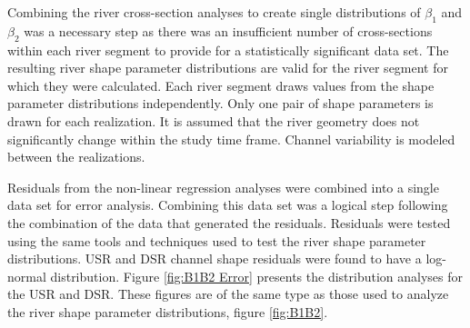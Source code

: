 \begin{linenumbers}
Combining the river cross-section analyses to create single distributions of $\beta_1$ and $\beta_2$ was a necessary step as there was an insufficient number of cross-sections within each river segment to provide for a statistically significant data set.  The resulting river shape parameter distributions are valid for the river segment for which they were calculated.  Each river segment draws values from the shape parameter distributions independently.  Only one pair of shape parameters is drawn for each realization.  It is assumed that the river geometry does not significantly change within the study time frame.  Channel variability is modeled between the realizations.

Residuals from the non-linear regression analyses were combined into a single data set for error analysis.  Combining this data set was a logical step following the combination of the data that generated the residuals.  Residuals were tested using the same tools and techniques used to test the river shape parameter distributions.  USR and DSR channel shape residuals were found to have a log-normal distribution.  Figure \ref{fig:B1B2 Error} presents the distribution analyses for the USR and DSR.  These figures are of the same type as those used to analyze the river shape parameter distributions, figure \ref{fig:B1B2}.


\end{linenumbers}
